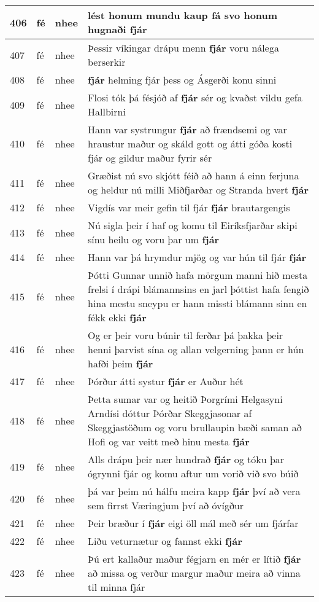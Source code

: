\documentclass{article}
\begin{document}
\begin{longtable}{p{1cm}|p{1cm}|p{1cm}|p{13cm}}
\hline
406&fé&nhee&lést honum mundu kaup fá svo honum hugnaði \textbf{fjár} \\
\hline
407&fé&nhee&Þessir víkingar drápu menn \textbf{fjár} voru nálega berserkir\\
\hline
408&fé&nhee& \textbf{fjár} helming fjár þess og Ásgerði konu sinni\\
\hline
409&fé&nhee&Flosi tók þá fésjóð af \textbf{fjár} sér og kvaðst vildu gefa Hallbirni\\
\hline
410&fé&nhee&Hann var systrungur \textbf{fjár} að frændsemi og var hraustur maður og skáld gott og átti góða kosti fjár og gildur maður fyrir sér\\
\hline
411&fé&nhee&Græðist nú svo skjótt féið að hann á einn ferjuna og heldur nú milli Miðfjarðar og Stranda hvert \textbf{fjár} \\
\hline
412&fé&nhee&Vigdís var meir gefin til fjár \textbf{fjár} brautargengis\\
\hline
413&fé&nhee&Nú sigla þeir í haf og komu til Eiríksfjarðar skipi sínu heilu og voru þar um \textbf{fjár} \\
\hline
414&fé&nhee&Hann var þá hrymdur mjög og var hún til fjár \textbf{fjár} \\
\hline
415&fé&nhee&Þótti Gunnar unnið hafa mörgum manni hið mesta frelsi í drápi blámannsins en jarl þóttist hafa fengið hina mestu sneypu er hann missti blámann sinn en fékk ekki \textbf{fjár} \\
\hline
416&fé&nhee&Og er þeir voru búnir til ferðar þá þakka þeir henni þarvist sína og allan velgerning þann er hún hafði þeim \textbf{fjár} \\
\hline
417&fé&nhee&Þórður átti systur \textbf{fjár} er Auður hét\\
\hline
418&fé&nhee&Þetta sumar var og heitið Þorgrími Helgasyni Arndísi dóttur Þórðar Skeggjasonar af Skeggjastöðum og voru brullaupin bæði saman að Hofi og var veitt með hinu mesta \textbf{fjár} \\
\hline
419&fé&nhee&Alls drápu þeir nær hundrað \textbf{fjár} og tóku þar ógrynni fjár og komu aftur um vorið við svo búið\\
\hline
420&fé&nhee&þá var þeim nú hálfu meira kapp \textbf{fjár} því að vera sem firrst Væringjum því að óvígður\\
\hline
421&fé&nhee&Þeir bræður í \textbf{fjár} eigi öll mál með sér um fjárfar\\
\hline
422&fé&nhee&Liðu veturnætur og fannst ekki \textbf{fjár} \\
\hline
423&fé&nhee&Þú ert kallaður maður fégjarn en mér er lítið \textbf{fjár} að missa og verður margur maður meira að vinna til minna fjár\\

\end{longtable}
\end{document}
